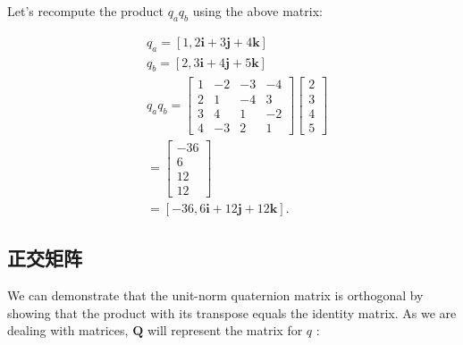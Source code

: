     Let's recompute the product $q_{a} q_{b}$ using the above matrix:

    $$
        \begin{aligned}
             & q_{a}=[1,2 \mathbf{i}+3 \mathbf{j}+4 \mathbf{k}]                                           \\
             & q_{b}=[2,3 \mathbf{i}+4 \mathbf{j}+5 \mathbf{k}]                                           \\
             & q_{a} q_{b}=\left[\begin{array}{rrrr}
                    1 & -2 & -3 & -4 \\
                    2 & 1  & -4 & 3  \\
                    3 & 4  & 1  & -2 \\
                    4 & -3 & 2  & 1
                \end{array}\right]\left[\begin{array}{l}
                    2 \\
                    3 \\
                    4 \\
                    5
                \end{array}\right] \\
             & =\left[\begin{array}{r}
                    -36 \\
                    6   \\
                    12  \\
                    12
                \end{array}\right]                                                   \\
             & =[-36,6 \mathbf{i}+12 \mathbf{j}+12 \mathbf{k}] \text {. }
        \end{aligned}
    $$

    \subsection{正交矩阵}
    We can demonstrate that the unit-norm quaternion matrix is orthogonal by showing that the product with its transpose equals the identity matrix. As we are dealing with matrices, $\mathbf{Q}$ will represent the matrix for $q$ :

